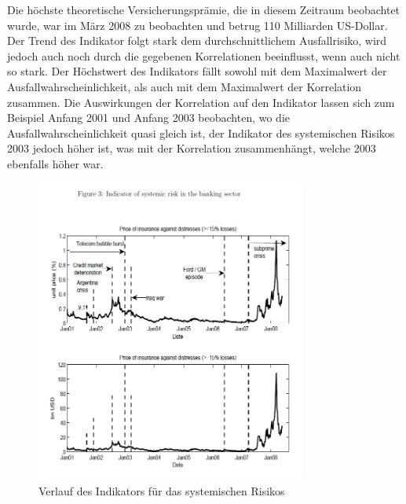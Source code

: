 \documentclass[a4paper,12pt]{scrartcl}
\begin{document}
Die höchste theoretische Versicherungsprämie, die in diesem Zeitraum beobachtet wurde, war im März 2008 zu beobachten und betrug 110 Milliarden US-Dollar.
Der Trend des Indikator folgt stark dem durchschnittlichem Ausfallrisiko, wird jedoch auch noch durch die gegebenen Korrelationen beeinflusst, wenn auch nicht so stark. Der Höchstwert des Indikators fällt sowohl mit dem Maximalwert der Ausfallwahrscheinlichkeit, als auch mit dem Maximalwert der Korrelation zusammen.
Die Auswirkungen der Korrelation auf den Indikator lassen sich zum Beispiel Anfang 2001 und Anfang 2003 beobachten, wo die Ausfallwahrscheinlichkeit quasi gleich ist, der Indikator des systemischen Risikos 2003 jedoch höher ist, was mit der Korrelation zusammenhängt, welche 2003 ebenfalls höher war.

\begin{figure}[htb]
	\centering
		\includegraphics[height=10cm]{Pictures/Figure3.png}
		\caption{Verlauf des Indikators für das systemischen Risikos}
\end{figure}
\end{document}
